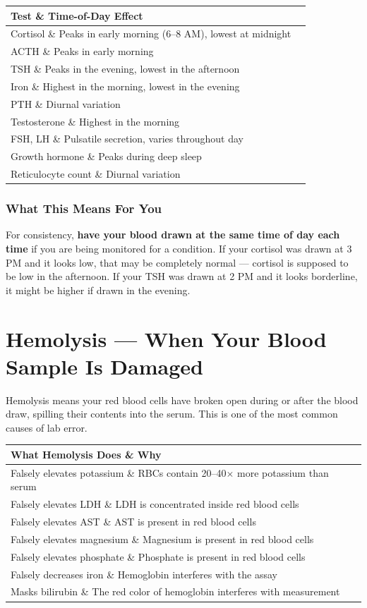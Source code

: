\begin{longtable}{@{}ll@{}}
\toprule
\textbf{Test} \& \textbf{Time-of-Day Effect} \\
\midrule
Cortisol \& Peaks in early morning (6--8 AM), lowest at midnight \\
ACTH \& Peaks in early morning \\
TSH \& Peaks in the evening, lowest in the afternoon \\
Iron \& Highest in the morning, lowest in the evening \\
PTH \& Diurnal variation \\
Testosterone \& Highest in the morning \\
FSH, LH \& Pulsatile secretion, varies throughout day \\
Growth hormone \& Peaks during deep sleep \\
Reticulocyte count \& Diurnal variation \\
\bottomrule
\end{longtable}

\subsubsection{What This Means For You}

For consistency, \textbf{have your blood drawn at the same time of day each time} if you are being monitored for a condition. If your cortisol was drawn at 3 PM and it looks low, that may be completely normal --- cortisol is supposed to be low in the afternoon. If your TSH was drawn at 2 PM and it looks borderline, it might be higher if drawn in the evening.

\clearpage
\section{Hemolysis --- When Your Blood Sample Is Damaged}

Hemolysis means your red blood cells have broken open during or after the blood draw, spilling their contents into the serum. This is one of the most common causes of lab error.

\begin{longtable}{@{}ll@{}}
\toprule
\textbf{What Hemolysis Does} \& \textbf{Why} \\
\midrule
Falsely elevates potassium \& RBCs contain 20--40$\times$ more potassium than serum \\
Falsely elevates LDH \& LDH is concentrated inside red blood cells \\
Falsely elevates AST \& AST is present in red blood cells \\
Falsely elevates magnesium \& Magnesium is present in red blood cells \\
Falsely elevates phosphate \& Phosphate is present in red blood cells \\
Falsely decreases iron \& Hemoglobin interferes with the assay \\
Masks bilirubin \& The red color of hemoglobin interferes with measurement \\
\bottomrule
\end{longtable}

